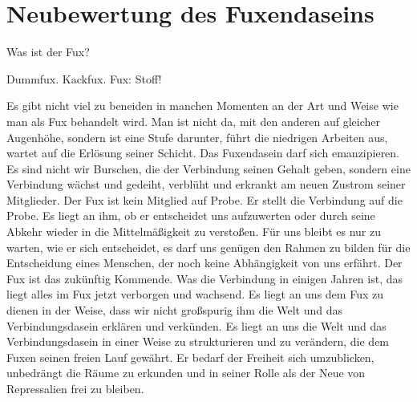 \section{Neubewertung des Fuxendaseins}


Was ist der Fux?

Dummfux. Kackfux. Fux: Stoff!

\begin{multicols}{2}
Es gibt nicht viel zu beneiden in manchen Momenten an der Art und Weise wie man als Fux behandelt wird. Man ist nicht da, mit den anderen auf gleicher Augenhöhe, sondern ist eine Stufe darunter, führt die niedrigen Arbeiten aus, wartet auf die Erlösung seiner Schicht.
Das Fuxendasein darf sich emanzipieren. Es sind nicht wir Burschen, die der Verbindung seinen Gehalt geben, sondern eine Verbindung wächst und gedeiht, verblüht und erkrankt am neuen Zustrom seiner Mitglieder. Der Fux ist kein Mitglied auf Probe. Er stellt die Verbindung auf die Probe. Es liegt an ihm, ob er entscheidet uns aufzuwerten oder durch seine Abkehr wieder in die Mittelmäßigkeit zu verstoßen. Für uns bleibt es nur zu warten, wie er sich entscheidet, es darf uns genügen den Rahmen zu bilden für die Entscheidung eines Menschen, der noch keine Abhängigkeit von uns erfährt.
Der Fux ist das zukünftig Kommende. Was die Verbindung in einigen Jahren ist, das liegt alles im Fux jetzt verborgen und wachsend. Es liegt an uns dem Fux zu dienen in der Weise, dass wir nicht großspurig ihm die Welt und das Verbindungsdasein erklären und verkünden. Es liegt an uns die Welt und das Verbindungsdasein in einer Weise zu strukturieren und zu verändern, die dem Fuxen seinen freien Lauf gewährt. Er bedarf der Freiheit sich umzublicken, unbedrängt die Räume zu erkunden und in seiner Rolle als der Neue von Repressalien frei zu bleiben.

\end{multicols}
